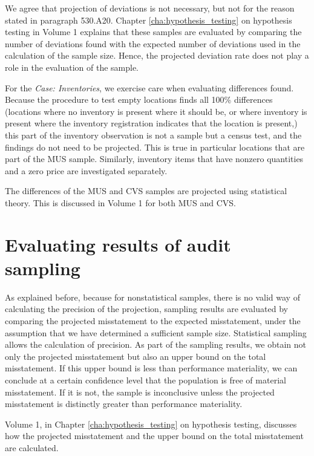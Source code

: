 We agree that projection of deviations is not necessary, but not for the reason stated in paragraph 530.A20. Chapter \ref{cha:hypothesis_testing} on hypothesis testing in Volume 1 explains that these samples are evaluated by comparing the number of deviations found with the expected number of deviations used in the calculation of the sample size. Hence, the projected deviation rate does not play a role in the evaluation of the sample. 

\bigskip
For the \emph{Case: Inventories}, we exercise care when evaluating differences found. Because the procedure to test empty locations finds all 100\% differences (locations where no inventory is present where it should be, or where inventory is present where the inventory registration indicates that the location is present,) this part of the inventory observation is not a sample but a census test, and the findings do not need to be projected. This is true in particular locations that are part of the MUS sample. Similarly, inventory items that have nonzero quantities and a zero price are investigated separately.

The differences of the MUS and CVS samples are projected using statistical theory. This is discussed in Volume 1 for both MUS and CVS.


\section{Evaluating results of audit sampling} %
\label{sec:evaluating_results_of_audit_sampling}

As explained before, because for nonstatistical samples, there is no valid way of calculating the precision of the projection, sampling results are evaluated by comparing the projected misstatement to the expected misstatement, under the assumption that we have determined a sufficient sample size. Statistical sampling allows the calculation of precision. As part of the sampling results, we obtain not only the projected misstatement but also an upper bound on the total misstatement. If this upper bound is less than performance materiality, we can conclude at a certain confidence level that the population is free of material misstatement. If it is not, the sample is inconclusive unless the projected misstatement is distinctly greater than performance materiality. 

Volume 1, in Chapter \ref{cha:hypothesis_testing} on hypothesis testing, discusses how the projected misstatement and the upper bound on the total misstatement are calculated.



